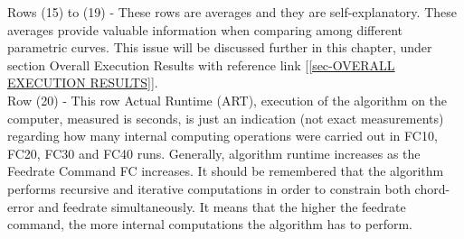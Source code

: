 
Rows (15) to (19) - These rows are averages and they are self-explanatory. These averages provide valuable information when comparing among different parametric curves. This issue will be discussed further in this chapter, under section Overall Execution Results with reference link [\ref{sec-OVERALL EXECUTION RESULTS}].\\
 
Row (20) - This row Actual Runtime (ART), execution of the algorithm on the computer, measured is seconds, is just an indication (not exact measurements) regarding how many internal computing operations were carried out in FC10, FC20, FC30 and FC40 runs. Generally, algorithm runtime increases as the Feedrate Command FC increases.  It should be remembered that the algorithm performs recursive and iterative computations in order to constrain both chord-error and feedrate simultaneously. It means that the  higher the feedrate command, the more internal computations the algorithm has to perform.\\


